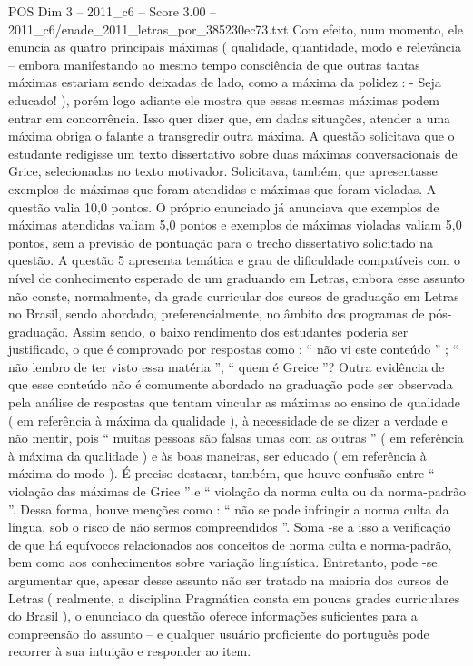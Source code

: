 \begin{textsample}{POS Dim 3 – 2011\_c6 – Score 3.00 – 2011\_c6/enade\_2011\_letras\_por\_385230ec73.txt}
Com efeito, num momento, ele enuncia as quatro principais máximas ( qualidade, quantidade, modo e relevância – embora manifestando ao mesmo tempo consciência de que outras tantas máximas estariam sendo deixadas de lado, como a máxima da polidez : - Seja educado! ), porém logo adiante ele mostra que essas mesmas máximas podem entrar em concorrência.
Isso quer dizer que, em dadas situações, atender a uma máxima obriga o falante a transgredir outra máxima.
A questão solicitava que o estudante redigisse um texto dissertativo sobre duas máximas conversacionais de Grice, selecionadas no texto motivador.
Solicitava, também, que apresentasse exemplos de máximas que foram atendidas e máximas que foram violadas.
A questão valia 10,0 pontos.
O próprio enunciado já anunciava que exemplos de máximas atendidas valiam 5,0 pontos e exemplos de máximas violadas valiam 5,0 pontos, sem a previsão de pontuação para o trecho dissertativo solicitado na questão.
A questão 5 apresenta temática e grau de dificuldade compatíveis com o nível de conhecimento esperado de um graduando em Letras, embora esse assunto não conste, normalmente, da grade curricular dos cursos de graduação em Letras no Brasil, sendo abordado, preferencialmente, no âmbito dos programas de pós-graduação.
Assim sendo, o baixo rendimento dos estudantes poderia ser justificado, o que é comprovado por respostas como : “ não vi este conteúdo ” ; “ não lembro de ter visto essa matéria ”, “ quem é Greice ”?
Outra evidência de que esse conteúdo não é comumente abordado na graduação pode ser observada pela análise de respostas que tentam vincular as máximas ao ensino de qualidade ( em referência à máxima da qualidade ), à necessidade de se dizer a verdade e não mentir, pois “ muitas pessoas são falsas umas com as outras ” ( em referência à máxima da qualidade ) e às boas maneiras, ser educado ( em referência à máxima do modo ).
É preciso destacar, também, que houve confusão entre “ violação das máximas de Grice ” e “ violação da norma culta ou da norma-padrão ”.
Dessa forma, houve menções como : “ não se pode infringir a norma culta da língua, sob o risco de não sermos compreendidos ”.
Soma -se a isso a verificação de que há equívocos relacionados aos conceitos de norma culta e norma-padrão, bem como aos conhecimentos sobre variação linguística.
Entretanto, pode -se argumentar que, apesar desse assunto não ser tratado na maioria dos cursos de Letras ( realmente, a disciplina Pragmática consta em poucas grades curriculares do Brasil ), o enunciado da questão oferece informações suficientes para a compreensão do assunto – e qualquer usuário proficiente do português pode recorrer à sua intuição e responder ao item.

\end{textsample}
